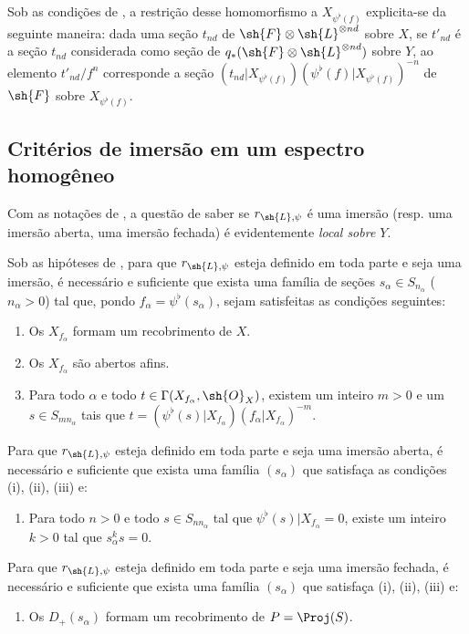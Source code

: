 \documentclass[oneside,10pt]{amsart}
\newcommand{\oldpage}[2][]{\marginnote{\normalfont\footnotesize\textbf{#1}~|~#2}\ignorespaces}
\let\EGAOriginalLabel\label
\renewcommand{\label}[1]{\phantomsection\EGAOriginalLabel{#1}}
\begin{document}
\begin{remarks}[3.7.9]
\begin{enumerate}
    Sob as condições de , a restrição desse homomorfismo a $X_{\psi^\flat(f)}$ explicita-se da seguinte maneira:
    dada uma seção $t_{nd}$ de $\sh{F}\otimes\sh{L}^{\otimes nd}$ sobre $X$, se $t'_{nd}$ é a seção $t_{nd}$ considerada como seção de $q_*(\sh{F}\otimes\sh{L}^{\otimes nd})$ sobre $Y$, ao elemento $t'_{nd}/f^n$ corresponde a seção $(t_{nd}|X_{\psi^\flat(f)})(\psi^\flat(f)|X_{\psi^\flat(f)})^{-n}$ de $\sh{F}$ sobre $X_{\psi^\flat(f)}$.
\end{enumerate}
\end{remarks}
\oldpage[II]{69}

\subsection{Critérios de imersão em um espectro homogêneo}
\label{subsection:II.3.8}

\begin{env}[3.8.1]
\label{II.3.8.1}
Com as notações de , a questão de saber se $r_{\sh{L},\psi}$ é uma imersão (resp. uma imersão aberta, uma imersão fechada) é evidentemente \emph{local sobre $Y$}.
\end{env}

\begin{proposition}[3.8.2]
\label{II.3.8.2}
Sob as hipóteses de , para que $r_{\sh{L},\psi}$ esteja definido em toda parte e seja uma imersão, é necessário e suficiente que exista uma família de seções $s_\alpha\in S_{n_\alpha}$ ($n_\alpha>0$) tal que, pondo $f_\alpha=\psi^\flat(s_\alpha)$, sejam satisfeitas as condições seguintes:
\begin{enumerate}
  \item[(i)] Os $X_{f_\alpha}$ formam um recobrimento de $X$.
  \item[(ii)] Os $X_{f_\alpha}$ são abertos afins.
  \item[(iii)] Para todo $\alpha$ e todo $t\in\Gamma(X_{f_\alpha},\sh{O}_X)$, existem um inteiro $m>0$ e um $s\in S_{mn_\alpha}$ tais que $t=(\psi^\flat(s)|X_{f_\alpha})(f_\alpha|X_{f_\alpha})^{-m}$.
\end{enumerate}

Para que $r_{\sh{L},\psi}$ esteja definido em toda parte e seja uma imersão aberta, é necessário e suficiente que exista uma família $(s_\alpha)$ que satisfaça as condições (i), (ii), (iii) e:
\begin{enumerate}
  \item[(iv)] Para todo $n>0$ e todo $s\in S_{nn_\alpha}$ tal que $\psi^\flat(s)|X_{f_\alpha}=0$, existe um inteiro $k>0$ tal que $s_\alpha^ks=0$.
\end{enumerate}

Para que $r_{\sh{L},\psi}$ esteja definido em toda parte e seja uma imersão fechada, é necessário e suficiente que exista uma família $(s_\alpha)$ que satisfaça (i), (ii), (iii) e:
\begin{enumerate}
  \item[(v)] Os $D_+(s_\alpha)$ formam um recobrimento de $P=\Proj(S)$.
\end{enumerate}
\end{proposition}
\end{document}
